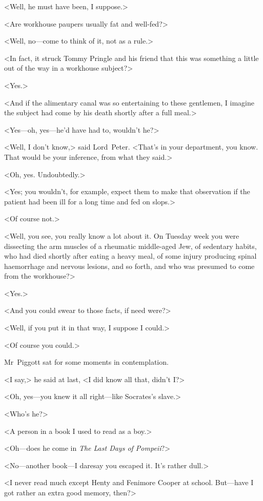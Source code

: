 <Well, he must have been, I suppose.>

<Are workhouse paupers usually fat and well-fed?>

<Well, no—come to think of it, not as a rule.>

<In fact, it struck Tommy Pringle and his friend that this was something a little out of the way in a workhouse subject?>

<Yes.>

<And if the alimentary canal was so entertaining to these gentlemen, I imagine the subject had come by his death shortly after a full meal.>

<Yes—oh, yes—he'd have had to, wouldn't he?>

<Well, I don't know,> said Lord~Peter. <That's in your department, you know. That would be your inference, from what they said.>

<Oh, yes. Undoubtedly.>

<Yes; you wouldn't, for example, expect them to make that observation if the patient had been ill for a long time and fed on slops.>

<Of course not.>

<Well, you see, you really know a lot about it. On Tuesday week you were dissecting the arm muscles of a rheumatic middle-aged Jew, of sedentary habits, who had died shortly after eating a heavy meal, of some injury producing spinal haemorrhage and nervous lesions, and so forth, and who was presumed to come from the workhouse?>

<Yes.>

<And you could swear to those facts, if need were?>

<Well, if you put it in that way, I suppose I could.>

<Of course you could.>

Mr~Piggott sat for some moments in contemplation.

<I say,> he said at last, <I did know all that, didn't I\@?>

<Oh, yes—you knew it all right—like Socrates's slave.>

<Who's he?>

<A person in a book I used to read as a boy.>

<Oh—does he come in \textit{The Last Days of Pompeii}?>

<No—another book—I daresay you escaped it. It's rather dull.>

<I never read much except Henty and Fenimore Cooper at school\textellipsis . But—have I got rather an extra good memory, then?>

